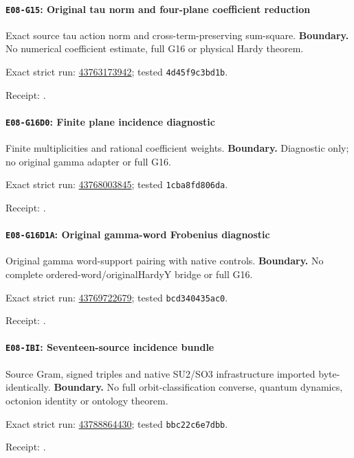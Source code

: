 \paragraph{\texttt{E08-G15}: Original tau norm and four-plane coefficient reduction}
Exact source tau action norm and cross-term-preserving sum-square.
\textbf{Boundary.} No numerical coefficient estimate, full G16 or physical Hardy theorem.
\par\noindent Exact strict run: \href{https://github.com/etblink/math/actions/runs/43763173942}{43763173942}; tested \texttt{4d45f9c3bd1b}.\par
\begingroup\small\sloppy\noindent Receipt: .\par\endgroup
\paragraph{\texttt{E08-G16D0}: Finite plane incidence diagnostic}
Finite multiplicities and rational coefficient weights.
\textbf{Boundary.} Diagnostic only; no original gamma adapter or full G16.
\par\noindent Exact strict run: \href{https://github.com/etblink/math/actions/runs/43768003845}{43768003845}; tested \texttt{1cba8fd806da}.\par
\begingroup\small\sloppy\noindent Receipt: .\par\endgroup
\paragraph{\texttt{E08-G16D1A}: Original gamma-word Frobenius diagnostic}
Original gamma word-support pairing with native controls.
\textbf{Boundary.} No complete ordered-word/originalHardyY bridge or full G16.
\par\noindent Exact strict run: \href{https://github.com/etblink/math/actions/runs/43769722679}{43769722679}; tested \texttt{bcd340435ac0}.\par
\begingroup\small\sloppy\noindent Receipt: .\par\endgroup
\paragraph{\texttt{E08-IBI}: Seventeen-source incidence bundle}
Source Gram, signed triples and native SU2/SO3 infrastructure imported byte-identically.
\textbf{Boundary.} No full orbit-classification converse, quantum dynamics, octonion identity or ontology theorem.
\par\noindent Exact strict run: \href{https://github.com/etblink/math/actions/runs/43788864430}{43788864430}; tested \texttt{bbc22c6e7dbb}.\par
\begingroup\small\sloppy\noindent Receipt: .\par\endgroup
